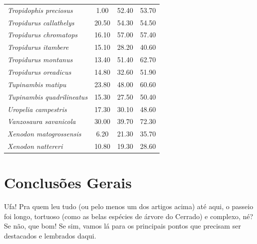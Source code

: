 \documentclass[12pt,openright,oneside,a4paper,english]{abntex2}
\begin{document}
\begin{longtable}{lccc}
	\textit{Tropidophis preciosus}&1.00 &52.40 &53.70 \\
	\textit{Tropidurus callathelys}&20.50 &54.30 &54.50 \\
	\textit{Tropidurus chromatops}&16.10 &57.00 &57.40 \\
	\textit{Tropidurus itambere}&15.10 &28.20 &40.60 \\
	\textit{Tropidurus montanus}&13.40 &51.40 &62.70 \\
	\textit{Tropidurus oreadicus}&14.80 &32.60 &51.90 \\
	\textit{Tupinambis matipu}&23.80 &48.00 &60.60 \\
	\textit{Tupinambis quadrilineatus}&15.30 &27.50 &50.40 \\
	\textit{Uropelia campestris}&17.30 &30.10 &48.60 \\
	\textit{Vanzosaura savanicola}&30.00 &39.70 &72.30 \\
	\textit{Xenodon matogrossensis}&6.20 &21.30 &35.70 \\
	\textit{Xenodon nattereri}&10.80 &19.30 &28.60 \\
	
\end{longtable}

\addtocounter{table}{-1}

\chapter*[Conclusões Gerais]{Conclusões Gerais}


Ufa! Pra quem leu tudo (ou pelo menos um dos artigos acima) até aqui, o passeio foi longo, tortuoso (como as belas espécies de árvore do Cerrado) e complexo, né? Se não, que bom! Se sim, vamos lá para os principais pontos que precisam ser destacados e lembrados daqui.
\end{document}
